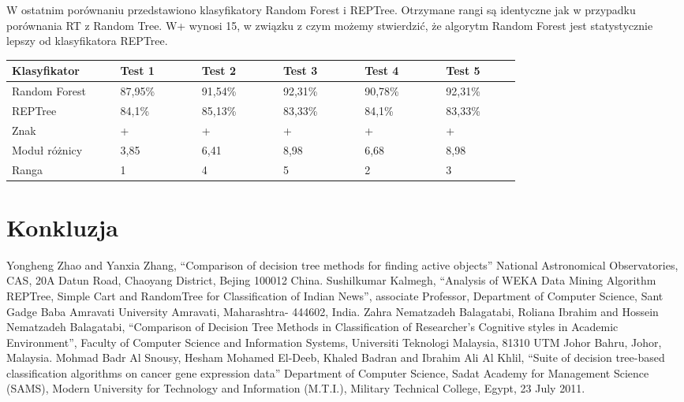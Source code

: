 \documentclass[conference]{IEEEtran}
\begin{document}
W ostatnim porównaniu przedstawiono klasyfikatory Random Forest i REPTree. Otrzymane rangi są identyczne jak w przypadku porównania RT z Random Tree. W+ wynosi 15, w związku z czym możemy stwierdzić, że algorytm Random Forest jest statystycznie lepszy od klasyfikatora REPTree.

\begin{table}[H]

	\begin{tabular}{|p{0.16\linewidth}|p{0.12\linewidth}|p{0.12\linewidth}|p{0.12\linewidth}|p{0.12\linewidth}|p{0.11\linewidth}|}%
	\hline\centering
	Klasyfikator 	& Test 1 & Test 2 & Test 3 & Test 4 & Test 5 \\ \hline\centering
	Random Forest	& 87,95\% & 91,54\% & 92,31\% & 90,78\% & 92,31\% \\ \hline\centering
	REPTree	& 84,1\% & 85,13\% & 83,33\% & 84,1\% & 83,33\% \\ \hline\centering
	Znak	& + & + & + & + & + \\ \hline\centering
	Moduł różnicy  & 3,85 & 6,41 & 8,98 & 6,68 & 8,98  \\ \hline\centering
	Ranga	& 1 & 4 & 5 & 2 & 3 \\ \hline
	\end{tabular}
\end{table}

\section{Konkluzja}

\begin{thebibliography}{00}
 Yongheng Zhao and Yanxia Zhang, ``Comparison of decision tree methods for finding active objects'' National Astronomical Observatories, CAS, 20A Datun Road, Chaoyang District, Bejing 100012 China.
 Sushilkumar Kalmegh, ``Analysis of WEKA Data Mining Algorithm REPTree, Simple Cart and RandomTree for Classification of Indian News'', associate Professor, Department of Computer Science, Sant Gadge Baba Amravati University
Amravati, Maharashtra- 444602, India.
 Zahra Nematzadeh Balagatabi, Roliana Ibrahim and Hossein Nematzadeh Balagatabi, ``Comparison of Decision Tree Methods in Classification of Researcher’s Cognitive styles in Academic Environment'', Faculty of Computer Science and Information Systems, Universiti Teknologi Malaysia, 81310 UTM Johor Bahru, Johor, Malaysia.
 Mohmad Badr Al Snousy, Hesham Mohamed El-Deeb, Khaled Badran and Ibrahim Ali Al Khlil, ``Suite of decision tree-based classification algorithms on cancer gene expression data'' Department of Computer Science, Sadat Academy for Management Science (SAMS), Modern University for Technology and Information (M.T.I.),  Military Technical College, Egypt, 23 July 2011.
\end{thebibliography}
\end{document}
